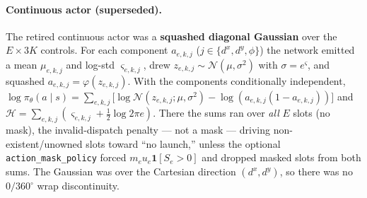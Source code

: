 \documentclass[11pt]{article}
\newcommand{\pol}{\pi_\theta}
\begin{document}
\paragraph{Continuous actor (superseded).} The retired continuous actor was a \textbf{squashed diagonal
Gaussian} over the $E\times 3K$ controls. For each component $a_{e,k,j}$ ($j\in\{d^x,d^y,\phi\}$) the
network emitted a mean $\mu_{e,k,j}$ and log-std $\varsigma_{e,k,j}$, drew $z_{e,k,j}\sim\mathcal
N(\mu,\sigma^2)$ with $\sigma=e^{\varsigma}$, and squashed $a_{e,k,j}=\varphi(z_{e,k,j})$. With the
components conditionally independent, $\log\pol(a\mid s)=\sum_{e,k,j}\big[\log\mathcal
N(z_{e,k,j};\mu,\sigma^2)-\log(a_{e,k,j}(1-a_{e,k,j}))\big]$ and $\mathcal
H=\sum_{e,k,j}(\varsigma_{e,k,j}+\tfrac12\log2\pi e)$. There the sums ran over \emph{all} $E$ slots
(no mask), the invalid-dispatch penalty --- not a mask --- driving non-existent/unowned slots toward
``no launch,'' unless the optional \texttt{action\_mask\_policy} forced
$m_e u_e\mathbf 1[S_e>0]$ and dropped masked slots from both sums. The Gaussian was over the Cartesian
direction $(d^x,d^y)$, so there was no $0/360^\circ$ wrap discontinuity.
\end{document}
